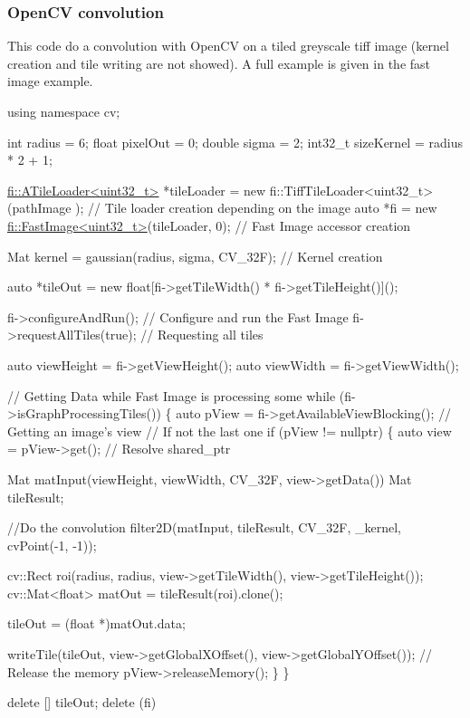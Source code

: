 \subsubsection*{Open\+CV convolution}

This code do a convolution with Open\+CV on a tiled greyscale tiff image (kernel creation and tile writing are not showed). A full example is given in the fast image example. 
\begin{DoxyCode}
\textcolor{keyword}{using namespace }cv; 

\textcolor{keywordtype}{int} radius = 6;
\textcolor{keywordtype}{float} pixelOut = 0;
\textcolor{keywordtype}{double} sigma = 2;
int32\_t sizeKernel = radius * 2 + 1;


\hyperlink{classfi_1_1ATileLoader}{fi::ATileLoader<uint32\_t>} *tileLoader = \textcolor{keyword}{new} fi::TiffTileLoader<uint32\_t>(pathImage
      ); \textcolor{comment}{// Tile loader creation depending on the image}
\textcolor{keyword}{auto} *fi = \textcolor{keyword}{new} \hyperlink{classfi_1_1FastImage}{fi::FastImage<uint32\_t>}(tileLoader, 0); \textcolor{comment}{// Fast Image accessor
       creation}

Mat kernel = gaussian(radius, sigma, CV\_32F); \textcolor{comment}{// Kernel creation }

\textcolor{keyword}{auto} *tileOut = \textcolor{keyword}{new} \textcolor{keywordtype}{float}[fi->getTileWidth() * fi->getTileHeight()]();

fi->configureAndRun(); \textcolor{comment}{// Configure and run the Fast Image}
fi->requestAllTiles(\textcolor{keyword}{true}); \textcolor{comment}{// Requesting all tiles }

\textcolor{keyword}{auto} viewHeight = fi->getViewHeight();
\textcolor{keyword}{auto} viewWidth = fi->getViewWidth();

\textcolor{comment}{// Getting Data while Fast Image is processing some}
\textcolor{keywordflow}{while} (fi->isGraphProcessingTiles()) \{
    \textcolor{keyword}{auto} pView = fi->getAvailableViewBlocking(); \textcolor{comment}{// Getting an image's view }
    \textcolor{comment}{// If not the last one}
    \textcolor{keywordflow}{if} (pView != \textcolor{keyword}{nullptr}) \{
        \textcolor{keyword}{auto} view = pView->get(); \textcolor{comment}{// Resolve shared\_ptr}

        Mat matInput(viewHeight, viewWidth, CV\_32F, view->getData())
        Mat tileResult;

        \textcolor{comment}{//Do the convolution}
        filter2D(matInput, tileResult, CV\_32F, \_kernel, cvPoint(-1, -1));

        cv::Rect roi(radius, radius, view->getTileWidth(), view->getTileHeight());
        cv::Mat<float> matOut = tileResult(roi).clone();

        tileOut = (\textcolor{keywordtype}{float} *)matOut.data;

        writeTile(tileOut, view->getGlobalXOffset(), view->getGlobalYOffset());
        \textcolor{comment}{// Release the memory}
        pView->releaseMemory();
    \}
\}

\textcolor{keyword}{delete} [] tileOut;
\textcolor{keyword}{delete} (fi)
\end{DoxyCode}


